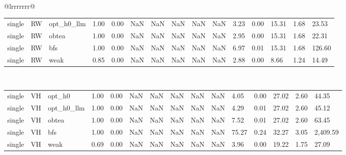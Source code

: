 \begin{table}[ht]
\begin{tabular}{@{}lrrrrrrr@{}}
\begin{tabular}{lllllllllllllll}
single & RW & opt_h0_llm & 1.00 & 0.00 & NaN & NaN & NaN & NaN & NaN & 3.23 & 0.00 & 15.31 & 1.68 & 23.53 \\
single & RW & obtea & 1.00 & 0.00 & NaN & NaN & NaN & NaN & NaN & 2.95 & 0.00 & 15.31 & 1.68 & 22.31 \\
single & RW & bfs & 1.00 & 0.00 & NaN & NaN & NaN & NaN & NaN & 6.97 & 0.01 & 15.31 & 1.68 & 126.60 \\
single & RW & weak & 0.85 & 0.00 & NaN & NaN & NaN & NaN & NaN & 2.88 & 0.00 & 8.66 & 1.24 & 14.49 \\
\bottomrule
\end{tabular}
\midrule
{} \\
\begin{tabular}{lllllllllllllll}
\toprule
\midrule
single & VH & opt_h0 & 1.00 & 0.00 & NaN & NaN & NaN & NaN & NaN & 4.05 & 0.00 & 27.02 & 2.60 & 44.35 \\
single & VH & opt_h0_llm & 1.00 & 0.00 & NaN & NaN & NaN & NaN & NaN & 4.29 & 0.01 & 27.02 & 2.60 & 45.12 \\
single & VH & obtea & 1.00 & 0.00 & NaN & NaN & NaN & NaN & NaN & 7.52 & 0.01 & 27.02 & 2.60 & 63.45 \\
single & VH & bfs & 1.00 & 0.00 & NaN & NaN & NaN & NaN & NaN & 75.27 & 0.24 & 32.27 & 3.05 & 2,409.59 \\
single & VH & weak & 0.69 & 0.00 & NaN & NaN & NaN & NaN & NaN & 3.96 & 0.00 & 19.22 & 1.75 & 27.09 \\
\bottomrule
\end{tabular}
\midrule
\bottomrule
\end{tabular}
\end{table}
\clearpage
